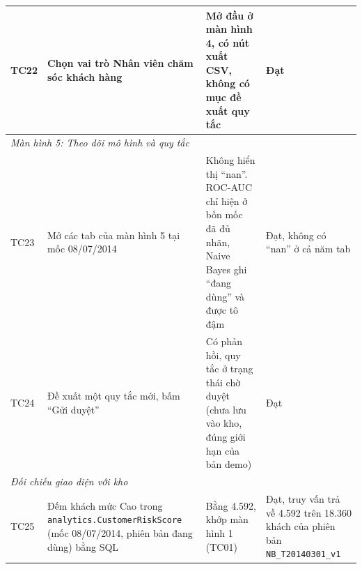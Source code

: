 {\begin{longtable}{p{0.95cm}p{4.0cm}p{4.3cm}p{5.5cm}}
TC22 & Chọn vai trò Nhân viên chăm sóc khách hàng & Mở đầu ở màn hình 4, có nút xuất CSV, không có mục đề xuất quy tắc & Đạt \\
\midrule
\multicolumn{4}{l}{\textit{Màn hình 5: Theo dõi mô hình và quy tắc}} \\
TC23 & Mở các tab của màn hình 5 tại mốc 08/07/2014 & Không hiển thị ``nan''. ROC-AUC chỉ hiện ở bốn mốc đã đủ nhãn, Naive Bayes ghi ``đang dùng'' và được tô đậm & Đạt, không có ``nan'' ở cả năm tab \\
TC24 & Đề xuất một quy tắc mới, bấm ``Gửi duyệt'' & Có phản hồi, quy tắc ở trạng thái chờ duyệt (chưa lưu vào kho, đúng giới hạn của bản demo) & Đạt \\
\midrule
\multicolumn{4}{l}{\textit{Đối chiếu giao diện với kho}} \\
TC25 & Đếm khách mức Cao trong \texttt{analytics.\allowbreak CustomerRiskScore} (mốc 08/07/2014, phiên bản đang dùng) bằng SQL & Bằng 4.592, khớp màn hình 1 (TC01) & Đạt, truy vấn trả về 4.592 trên 18.360 khách của phiên bản \texttt{NB\_T20140301\_v1} \\
\end{longtable}
}
